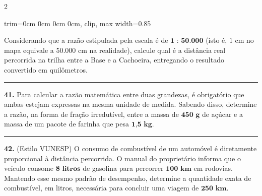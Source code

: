 \documentclass[twoside, 10pt, a4paper]{article}
\newlength{\espacoPreQuestao}\setlength{\espacoPreQuestao}{0.1cm}
\newlength{\espacoQuestao}\setlength{\espacoQuestao}{0.2cm}
\newcommand{\larguraTikz}{0.85\linewidth}
\begin{document}
\begin{multicols*}{2}
\begin{center}
\begin{adjustbox}{trim=0cm 0cm 0cm 0cm, clip, max width=\larguraTikz}
\end{adjustbox}
\end{center}
Considerando que a razão estipulada pela escala é de $ \textbf{1 : 50.000} $ (isto é, $ 1 $ cm no mapa equivale a $ 50.000 $ cm na realidade), calcule qual é a distância real percorrida na trilha entre a Base e a Cachoeira, entregando o resultado convertido em quilômetros.
\par\vspace{\espacoQuestao}
\noindent\textcolor{CorLinha}{\rule{\linewidth}{0.5pt}} 
\par\vspace{\espacoPreQuestao}
\textbf{41.} Para calcular a razão matemática entre duas grandezas, é obrigatório que ambas estejam expressas na mesma unidade de medida. Sabendo disso, determine a razão, na forma de fração irredutível, entre a massa de $ \textbf{450 g} $ de açúcar e a massa de um pacote de farinha que pesa $ \textbf{1,5 kg} $.
\par\vspace{\espacoQuestao}

\noindent\textcolor{CorLinha}{\rule{\linewidth}{0.5pt}} 
\par\vspace{\espacoPreQuestao}
\textbf{42.} (Estilo VUNESP) O consumo de combustível de um automóvel é diretamente proporcional à distância percorrida. O manual do proprietário informa que o veículo consome $ \textbf{8 litros} $ de gasolina para percorrer $ \textbf{100 km} $ em rodovias. Mantendo esse mesmo padrão de desempenho, determine a quantidade exata de combustível, em litros, necessária para concluir uma viagem de $ \textbf{250 km} $.
\par\vspace{\espacoQuestao}


\end{multicols*}
\end{document}
